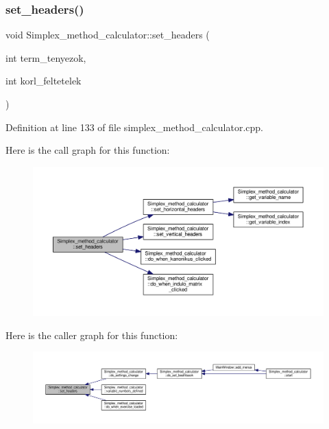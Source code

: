 \subsubsection{\texorpdfstring{set\+\_\+headers()}{set\_headers()}}
{\footnotesize\ttfamily void Simplex\+\_\+method\+\_\+calculator\+::set\+\_\+headers (\begin{DoxyParamCaption}\item[{int}]{term\+\_\+tenyezok,  }\item[{int}]{korl\+\_\+feltetelek }\end{DoxyParamCaption})\hspace{0.3cm}{\ttfamily [private]}}



Definition at line 133 of file simplex\+\_\+method\+\_\+calculator.\+cpp.

Here is the call graph for this function\+:\nopagebreak
\begin{figure}[H]
\begin{center}
\leavevmode
\includegraphics[width=350pt]{classSimplex__method__calculator_a49ee6c7aaf6f7429b2d7bb3110ead22f_cgraph}
\end{center}
\end{figure}
Here is the caller graph for this function\+:\nopagebreak
\begin{figure}[H]
\begin{center}
\leavevmode
\includegraphics[width=350pt]{classSimplex__method__calculator_a49ee6c7aaf6f7429b2d7bb3110ead22f_icgraph}
\end{center}
\end{figure}
\mbox{\label{classSimplex__method__calculator_a56de11e5f19d4c81ee0554196834b54e}} 
